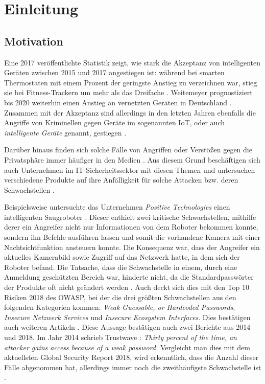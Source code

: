 \chapter{Einleitung}

\section{Motivation}
Eine 2017 veröffentlichte Statistik zeigt, wie stark die Akzeptanz von intelligenten Geräten zwischen 2015 und 2017 angestiegen ist: während bei smarten Thermostaten mit einem Prozent der geringste Anstieg zu verzeichnen war, stieg sie bei Fitness-Trackern um mehr als das Dreifache \cite{nier_2017}. Weitemeyer prognostiziert bis 2020 weiterhin einen Anstieg an vernetzten Geräten in Deutschland \cite{weitemeyer_2018}.
Zusammen mit der Akzeptanz sind allerdings in den letzten Jahren ebenfalls die Angriffe von Kriminellen gegen Geräte im sogenannten \ac{IoT}, oder auch \emph{intelligente Geräte} genannt, gestiegen \cite{statista_2019}.

Darüber hinaus finden sich solche Fälle von Angriffen oder Verstößen gegen die Privatsphäre immer häufiger in den Medien \cite{holland_2016,it_verlag_informationstechnik_gmbh_2018}. Aus diesem Grund beschäftigen sich auch Unternehmen im IT-Sicherheitssektor mit diesen Themen und untersuchen verschiedene Produkte auf ihre Anfälligkeit für solche Attacken bzw. deren Schwachstellen \cite{lorenz_2018,ao_kaspersky_lab_2018}.

Beispielsweise untersuchte das Unternehmen \emph{Positive Technologies} einen intelligenten Saugroboter \cite{salmi_2017}.
Dieser enthielt zwei kritische Schwachstellen, mithilfe derer ein Angreifer nicht nur Informationen von dem Roboter bekommen konnte, sondern ihn Befehle ausführen lassen und somit die vorhandene Kamera mit einer Nachtsichtfunktion ansteuern konnte. Die Konsequenz war, dass der Angreifer ein aktuelles Kamerabild sowie Zugriff auf das Netzwerk hatte, in dem sich der Roboter befand. Die Tatsache, dass die Schwachstelle in einem, durch eine Anmeldung geschützten Bereich war, hinderte nicht, da die Standardpasswörter der Produkte oft nicht geändert werden \cite{positive_technologies_2018}.
Auch deckt sich dies mit den Top 10 Risiken 2018 des \ac{OWASP}, bei der die drei größten Schwachstellen aus den folgenden Kategorien kommen: \emph{Weak Guessable, or Hardcoded Passwords}, \emph{Insecure Netzwerk Services} und \emph{Insecure Ecosystem Interfaces}. Dies bestätigen auch weiteren Artikeln \cite{guzman_2019,eckstein_2018}.
Diese Aussage bestätigen auch zwei Berichte aus 2014 und 2018.
Im Jahr 2014 schrieb Trustwave \cite{trustwave_holdings_inc_2014}: \emph{Thirty percent of the time, an attacker gains access because of a weak password.}
Vergleicht man dies mit dem aktuellsten Global Security Report 2018, wird erkenntlich, dass die Anzahl dieser Fälle abgenommen hat, allerdings immer noch die zweithäufigste Schwachstelle ist \cite{trustwave_holdings_inc_2018}.

